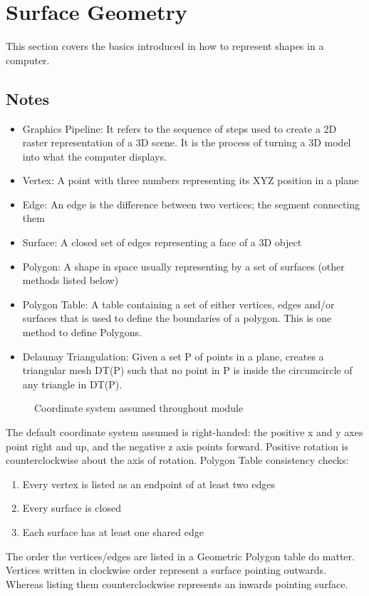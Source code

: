 \section{Surface Geometry}
This section covers the basics introduced in how to represent shapes in a computer.
\subsection{Notes}
\begin{itemize}
	\item Graphics Pipeline: It refers to the sequence of steps used to create a 2D raster representation of a 3D scene. It is the process of turning a 3D model into what the computer displays. 
	\item Vertex: A point with three numbers representing its XYZ position in a plane
	\item Edge: An edge is the difference between two vertices; the segment connecting them
	\item Surface: A closed set of edges representing a face of a 3D object
	\item Polygon: A shape in space usually representing by a set of surfaces (other methods listed below)
	\item Polygon Table: A table containing a set of either vertices, edges and/or surfaces that is used to define the boundaries of a polygon. This is one method to define Polygons.
	\item Delaunay Triangulation: Given a set P of points in a plane, creates a triangular mesh DT(P) such that no point in P is inside the circumcircle of any triangle in DT(P).
\end{itemize}
   \begin{figure}[!htb]
	\caption{\label{fig:rhcoords} Coordinate system assumed throughout module}
	\end{figure}
The default coordinate system assumed is right-handed: the positive x and y axes point right and up, and the negative z axis points forward. Positive rotation is counterclockwise about the axis of rotation.
\newline
Polygon Table consistency checks:
\begin{enumerate}
	\item Every vertex is listed as an endpoint of at least two edges
	\item Every surface is closed
	\item Each surface has at least one shared edge
\end{enumerate}
The order the vertices/edges are listed in a Geometric Polygon table do matter. Vertices written in clockwise order represent a surface pointing outwards. Whereas listing them counterclockwise represents an inwards pointing surface.


